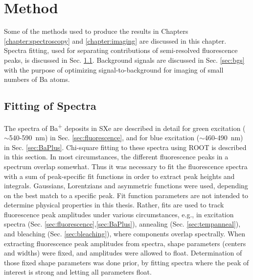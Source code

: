 \chapter{Method}
\label{chapter:method}

Some of the methods used to produce the results in Chapters \ref{chapter:spectroscopy} and \ref{chapter:imaging} are discussed in this chapter.  Spectra fitting, used for separating contributions of semi-resolved fluorescence peaks, is discussed in Sec. \ref{sec:fitting}.  Background signals are discussed in Sec. \ref{sec:bgs} with the purpose of optimizing signal-to-background for imaging of small numbers of Ba atoms.

\section{Fitting of Spectra}
\label{sec:fitting} %

The spectra of Ba\textsuperscript{+} deposits in SXe are described in detail for green excitation ($\sim$540-590~nm) in Sec. \ref{sec:fluorescence}, and for blue excitation ($\sim$460-490~nm) in Sec. \ref{sec:BaPlus}.  Chi-square fitting to these spectra using ROOT is described in this section.  In most circumstances, the different fluorescence peaks in a spectrum overlap somewhat.  Thus it was necessary to fit the fluorescence spectra with a sum of peak-specific fit functions in order to extract peak heights and integrals.  Gaussians, Lorentzians and asymmetric functions were used, depending on the best match to a specific peak.  Fit function parameters are not intended to determine physical properties in this thesis.  Rather, fits are used to track fluorescence peak amplitudes under various circumstances, e.g., in excitation spectra (Sec. \ref{sec:fluorescence},\ref{sec:BaPlus}), annealing (Sec. \ref{sec:tempanneal}), and bleaching (Sec. \ref{sec:bleaching}), where components overlap spectrally.  When extracting fluorescence peak amplitudes from spectra, shape parameters (centers and widths) were fixed, and amplitudes were allowed to float.  Determination of those fixed shape parameters was done prior, by fitting spectra where the peak of interest is strong and letting all parameters float.


